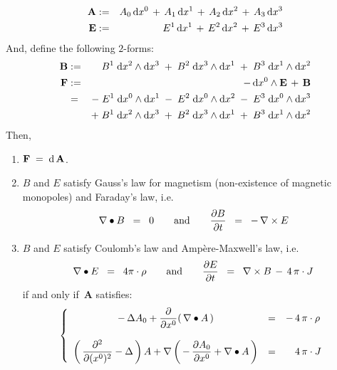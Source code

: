 \begin{theorem}
\begin{eqnarray*}
\\
\mathbf{A}
& := &
	A_{0}\,\textnormal{d} x^{0} \,+\, A_{1}\,\textnormal{d} x^{1}  \,+\, A_{2}\,\textnormal{d} x^{2}  \,+\, A_{3}\,\textnormal{d} x^{3}
\\
\mathbf{E}
& := &
	E^{1}\,\textnormal{d} x^{1} \,+\, E^{2}\,\textnormal{d} x^{2} \,+\, E^{3}\,\textnormal{d} x^{3}
\end{eqnarray*}
\vskip 0.3cm
\noindent
And, define the following $2$-forms:
\begin{eqnarray*}
\mathbf{B}
& := &
	B^{1}\;\textnormal{d} x^{2} \wedge \textnormal{d} x^{3}
	\;+\;
	B^{2}\;\textnormal{d} x^{3} \wedge \textnormal{d} x^{1}
	\;+\;
	B^{3}\;\textnormal{d} x^{1} \wedge \textnormal{d} x^{2}
\\
\mathbf{F}
& := &
	- \, \textnormal{d} x^{0} \wedge \mathbf{E} \, + \, \mathbf{B}
\\
& = &
	- \; E^{1}\;\textnormal{d} x^{0} \wedge \textnormal{d} x^{1} \; - \; E^{2}\;\textnormal{d} x^{0} \wedge \textnormal{d} x^{2} \; - \; E^{3}\;\textnormal{d} x^{0} \wedge \textnormal{d} x^{3}
\\
&&
	+\;
	B^{1}\;\textnormal{d} x^{2} \wedge \textnormal{d} x^{3}
	\;+\;
	B^{2}\;\textnormal{d} x^{3} \wedge \textnormal{d} x^{1}
	\;+\;
	B^{3}\;\textnormal{d} x^{1} \wedge \textnormal{d} x^{2}
\end{eqnarray*}
Then,
\begin{enumerate}
\item
	$\mathbf{F} \; = \; \textnormal{d}\,\mathbf{A}$.
\item
	$B$ and $E$ satisfy Gauss's law for magnetism (non-existence of magnetic monopoles) and Faraday's law, i.e.
	\begin{equation*}
	\nabla \bullet B \;\; = \;\; 0
	\quad\quad\textnormal{and}\quad\quad
	\dfrac{\partial B}{\partial t} \;\; = \;\; -\,\nabla \times E
	\end{equation*}	
\item	
	$B$ and $E$ satisfy Coulomb's law and Amp\`{e}re-Maxwell's law, i.e.
	\begin{equation*}
	\nabla \bullet E \;\; = \;\; 4 \pi \cdot \rho
	\quad\quad\textnormal{and}\quad\quad
	\dfrac{\partial E}{\partial t} \;\; = \;\; \nabla \times B \,-\, 4\,\pi\cdot J
	\end{equation*}
	if and only if \,$\mathbf{A}$ satisfies:
	\begin{equation*}
	\left\{\begin{array}{ccl}
		-\,\Delta A_{0} + \dfrac{\partial}{\partial x^{0}}\!\left(\,\nabla \bullet A\,\right)
		& = &
			- \, 4\,\pi\cdot\rho
		\\ \\
		\left(\,\dfrac{\partial^{2}}{\partial(x^{0})^{2}} - \Delta\,\right)A
		+
		\nabla\left(\, -\,\dfrac{\partial A_{0}}{\partial x^{0}} + \nabla \bullet A \,\right)
		& = &
			{\color{white}-} \, 4\,\pi \cdot J
		\end{array}\right.
	\end{equation*}
\end{enumerate}
\end{theorem}
